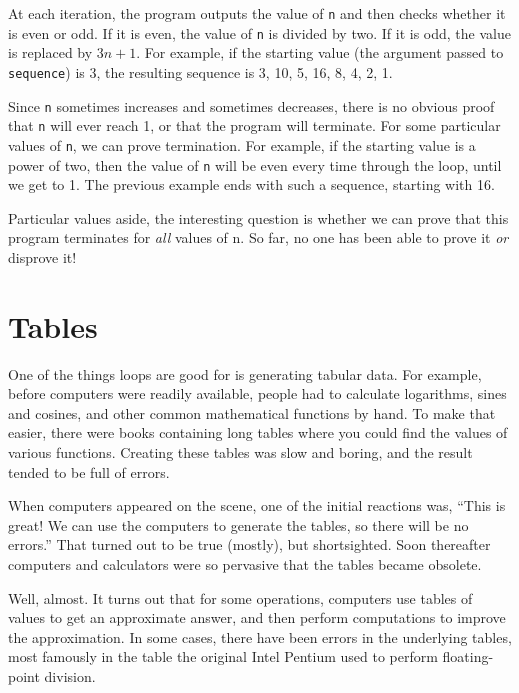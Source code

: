 At each iteration, the program outputs the value of {\tt n} and then
checks whether it is even or odd.  If it is even, the value of
{\tt n} is divided by two.  If it is odd, the value is replaced
by $3n+1$.  For example, if the starting value (the argument passed
to {\tt sequence}) is 3, the resulting sequence is
3, 10, 5, 16, 8, 4, 2, 1.

Since {\tt n} sometimes increases and sometimes decreases, there is no
obvious proof that {\tt n} will ever reach 1, or that the program will
terminate.  For some particular values of {\tt n}, we can prove
termination.  For example, if the starting value is a power of two, then
the value of {\tt n} will be even every time through the loop, until
we get to 1.  The previous example ends with such a sequence,
starting with 16.

Particular values aside, the interesting question is whether
we can prove that this program terminates for {\em all} values of n.
So far, no one has been able to prove it {\em or} disprove it!

\section{Tables}

One of the things loops are good for is generating
tabular data.  For example, before computers were readily available,
people had to calculate logarithms, sines and cosines, and other
common mathematical functions by hand.
To make that easier, there were books containing long tables
where you could find the values of various functions.
Creating these tables was slow and boring, and the result
tended to be full of errors.

When computers appeared on the scene, one of the initial reactions
was, ``This is great!  We can use the computers to generate the
tables, so there will be no errors.''  That turned out to be true
(mostly), but shortsighted.  Soon thereafter computers and
calculators were so pervasive that the tables became obsolete.

Well, almost.  It turns out that for some operations, computers
use tables of values to get an approximate answer, and then
perform computations to improve the approximation.  In some
cases, there have been errors in the underlying tables, most
famously in the table the original Intel Pentium used to perform
floating-point division.


